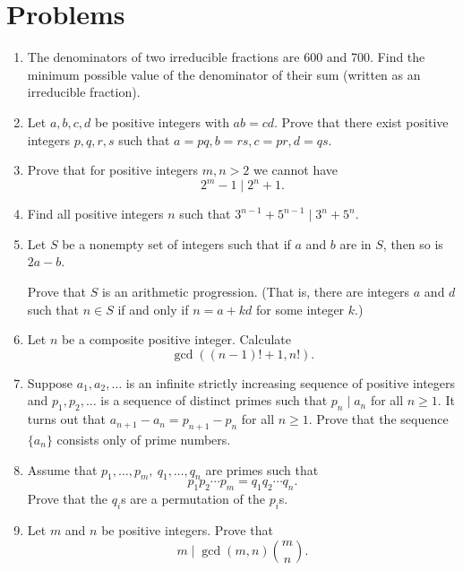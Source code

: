 \documentclass{article}
\begin{document}
\section{Problems}
  \begin{enumerate}
    \item The denominators of two irreducible fractions are 600 and 700. Find the
      minimum possible value of the denominator of their sum (written as an irreducible
      fraction).
    \item Let $a,b,c,d$ be positive integers with $ab=cd$. Prove that there
      exist positive integers $p,q,r,s$ such that \(a=pq,b=rs,c=pr,d=qs\).
    \item Prove that for positive integers $m,n>2$ we cannot have \[2^m-1\mid
        2^n+1.\]
    \item Find all positive integers $n$ such that $3^{n-1}+5^{n-1}\mid
      3^n+5^n$.
    \item Let $S$ be a nonempty set of integers such that if $a$ and $b$ are in $S$, then
      so is $2a-b$.

      Prove that $S$ is an arithmetic
      progression. (That is, there are integers $a$ and $d$ such that $n\in S$ if
      and only if 
      $n=a+kd$ for some integer $k$.)
    \item Let $n$ be a composite positive integer. Calculate
      \[\gcd((n-1)!+1,n!).\]
    \item Suppose $a_1,a_2, \dots$ is an infinite strictly increasing sequence of
      positive integers and $p_1, p_2, \dots$ is a sequence of distinct primes
      such that $p_n \mid a_n$ for all $n \ge 1$. It turns out that
      $a_{n+1}-a_n=p_{n+1}-p_n$ for all $n\ge 1$. Prove that the sequence $\{a_n\}$
      consists only of prime numbers.
    \item Assume that $p_1,\ldots,p_m,\ q_1,\ldots,q_n$ are primes such that
      \[p_1p_2\cdots p_m=q_1q_2\cdots q_n.\]
      Prove that the $q_i$s are a permutation of the $p_i$s.
    \item Let $m$ and $n$ be positive integers. Prove that
      \[m\mid\gcd(m,n)\binom mn.\]
  \end{enumerate}
\newpage
\end{document}
